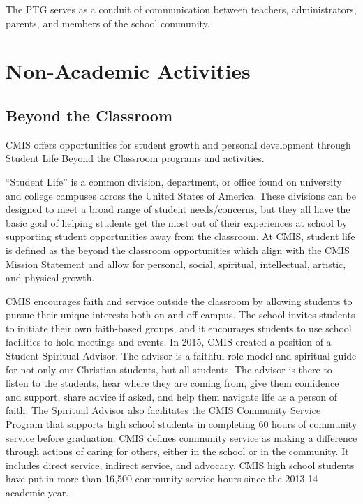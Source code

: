 The PTG serves as a conduit of communication between teachers, administrators, parents, and members of the school community.  

\section{Non-Academic Activities}

\subsection{Beyond the Classroom}

CMIS offers opportunities for student growth and personal development through Student Life Beyond the Classroom programs and activities.  


“Student Life” is a common division, department, or office found on university and college campuses across the United States of America.  These divisions can be designed to meet a broad range of student needs/concerns, but they all have the basic goal of helping students get the most out of their experiences at school by supporting student opportunities away from the classroom.  At CMIS, student life is defined as the beyond the classroom opportunities which align with the CMIS Mission Statement and allow for personal, social, spiritual, intellectual, artistic, and physical growth.


CMIS encourages faith and service outside the classroom by allowing students to pursue their unique interests both on and off campus. The school invites students to initiate their own faith-based groups, and it encourages students to use school facilities to hold meetings and events.  In 2015, CMIS created a position of  a Student Spiritual Advisor.  The advisor is a faithful role model and spiritual guide for not only our Christian students, but all students. The advisor is there to listen to the students, hear where they are coming from, give them confidence and support, share advice if asked, and help them navigate life as a person of faith. The Spiritual Advisor also facilitates the CMIS Community Service Program that supports high school students in completing 60 hours of \href{http://cmis.ac.th/programs/community_service}{community service} before graduation. CMIS defines community service as making a difference through actions of caring for others, either in the school or in the community.  It includes direct service, indirect service, and advocacy. CMIS high school students have put in more than 16,500 community service hours since the 2013-14 academic year.

